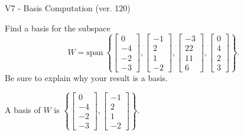 \begin{exercise}
  \begin{exerciseTitle}V7 - Basis Computation (ver. 120)\end{exerciseTitle}
  \begin{exerciseStatement}
    Find a basis for the subspace 
\[W=\mathrm{span}\ \left\{\left[\begin{array}{r}
0 \\
-4 \\
-2 \\
-3
\end{array}\right] , \left[\begin{array}{r}
-1 \\
2 \\
1 \\
-2
\end{array}\right] , \left[\begin{array}{r}
-3 \\
22 \\
11 \\
6
\end{array}\right] , \left[\begin{array}{r}
0 \\
4 \\
2 \\
3
\end{array}\right]\right\}.\]
 Be sure to explain why your result is a basis.


  \end{exerciseStatement}
  \begin{exerciseAnswer}
   A basis of \(W\) is  \(\left\{\left[\begin{array}{r}
0 \\
-4 \\
-2 \\
-3
\end{array}\right] , \left[\begin{array}{r}
-1 \\
2 \\
1 \\
-2
\end{array}\right]\right\}\).
  


  \end{exerciseAnswer}
\end{exercise}